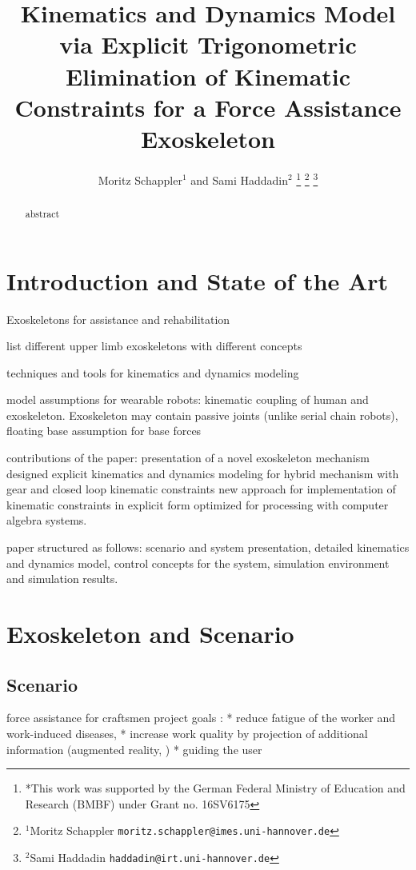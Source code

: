 \documentclass[letterpaper, 10 pt, conference]{ieeeconf}  %
\title{\LARGE \bf
Kinematics and Dynamics Model via Explicit Trigonometric Elimination of Kinematic Constraints for a Force Assistance Exoskeleton
}
\author{Moritz Schappler$^{1}$ and Sami Haddadin$^{2}$%
\thanks{*This work was supported by the German Federal Ministry of Education and Research (BMBF) under Grant no. 16SV6175}%
\thanks{$^{1}$Moritz Schappler
        {\tt\small moritz.schappler@imes.uni-hannover.de}}%
\thanks{$^{2}$Sami Haddadin
        {\tt\small haddadin@irt.uni-hannover.de}}%
}
\begin{document}
\maketitle
\thispagestyle{empty}
\pagestyle{empty}


\begin{abstract}
abstract

\end{abstract}


\section{Introduction and State of the Art}

Exoskeletons for assistance and rehabilitation

list different upper limb exoskeletons with different concepts

techniques and tools for kinematics and dynamics modeling

model assumptions for wearable robots: kinematic coupling of human and exoskeleton. Exoskeleton may contain passive joints (unlike serial chain robots), floating base assumption for base forces

contributions of the paper:
presentation of a novel exoskeleton mechanism designed
explicit kinematics and dynamics modeling for hybrid mechanism with gear and closed loop kinematic constraints
new approach for implementation of kinematic constraints in explicit form optimized for processing with computer algebra systems.

paper structured as follows: scenario and system presentation, detailed kinematics and dynamics model, control concepts for the system, simulation environment and simulation results.

\section{Exoskeleton and Scenario}

\subsection{Scenario}

force assistance for craftsmen
project goals \cite{NuelleSchTapLil2017}: 
* reduce fatigue of the worker and work-induced diseases, 
* increase work quality by projection of additional information (augmented reality, \cite{NuelleBriTapDem2018})
* guiding the user
\end{document}
